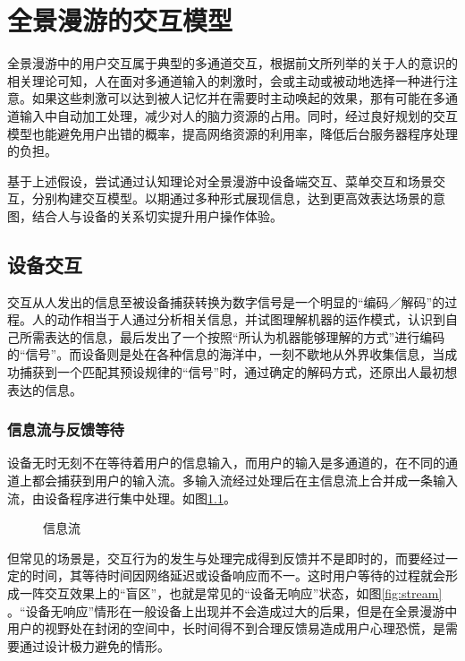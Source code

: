\chapter{全景漫游的交互模型}
全景漫游中的用户交互属于典型的多通道交互，根据前文所列举的关于人的意识的相关理论可知，人在面对多通道输入的刺激时，会或主动或被动地选择一种进行注意。如果这些刺激可以达到被人记忆并在需要时主动唤起的效果，那有可能在多通道输入中自动加工处理，减少对人的脑力资源的占用。同时，经过良好规划的交互模型也能避免用户出错的概率，提高网络资源的利用率，降低后台服务器程序处理的负担。

基于上述假设，尝试通过认知理论对全景漫游中设备端交互、菜单交互和场景交互，分别构建交互模型。以期通过多种形式展现信息，达到更高效表达场景的意图，结合人与设备的关系切实提升用户操作体验。

\section{设备交互}
交互从人发出的信息至被设备捕获转换为数字信号是一个明显的“编码／解码”的过程。人的动作相当于人通过分析相关信息，并试图理解机器的运作模式，认识到自己所需表达的信息，最后发出了一个按照“所认为机器能够理解的方式”进行编码的“信号”。而设备则是处在各种信息的海洋中，一刻不歇地从外界收集信息，当成功捕获到一个匹配其预设规律的“信号”时，通过确定的解码方式，还原出人最初想表达的信息。

\subsection{信息流与反馈等待}
设备无时无刻不在等待着用户的信息输入，而用户的输入是多通道的，在不同的通道上都会捕获到用户的输入流。多输入流经过处理后在主信息流上合并成一条输入流，由设备程序进行集中处理。如图\ref{fig:reactive}。

\begin{figure}[htp]
\centering
{}
\caption{信息流}
\label{fig:reactive}
\end{figure}

但常见的场景是，交互行为的发生与处理完成得到反馈并不是即时的，而要经过一定的时间，其等待时间因网络延迟或设备响应而不一。这时用户等待的过程就会形成一阵交互效果上的“盲区”，也就是常见的“设备无响应”状态，如图\ref{fig:stream}	。“设备无响应”情形在一般设备上出现并不会造成过大的后果，但是在全景漫游中用户的视野处在封闭的空间中，长时间得不到合理反馈易造成用户心理恐慌，是需要通过设计极力避免的情形。

